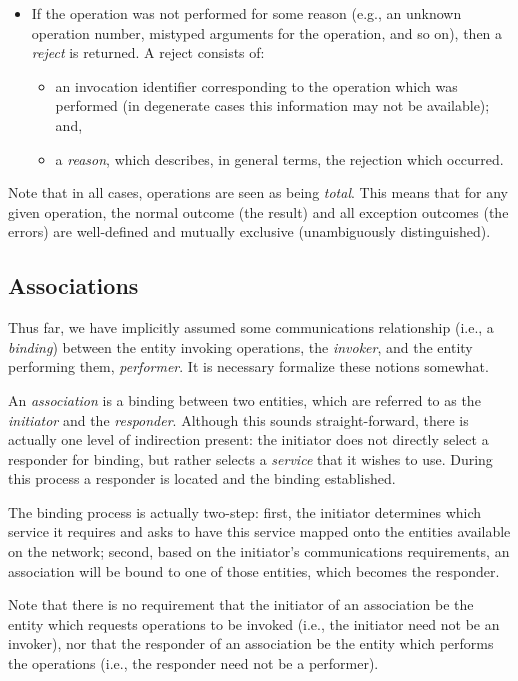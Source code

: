 \begin{itemize}
\item	If the operation was not performed for some reason
	(e.g., an unknown operation number, mistyped arguments for
	the operation, and so on), then a {\em reject\/} is returned.
	A reject consists of:
	\begin{itemize}
	\item	an invocation identifier corresponding to the operation
		which was performed
		(in degenerate cases this information may not be available);
		and,

	\item	a {\em reason},
		which describes, in general terms, the rejection which
		occurred.
	\end{itemize}
\end{itemize}
Note that in all cases,
operations are seen as being {\em total}.
This means that for any given operation,
the normal outcome (the result)
and all exception outcomes (the errors) are well-defined and mutually
exclusive (unambiguously distinguished).

\subsection	{Associations}
Thus far, we have implicitly assumed some communications relationship
(i.e., a {\em binding\/}) between the entity invoking operations,
the {\em invoker},
and the entity performing them,
{\em performer}.
It is necessary formalize these notions somewhat.

An {\em association\/} is a binding between two entities,
which are referred to as
the {\em initiator\/} and the {\em responder}.
Although this sounds straight-forward,
there is actually one level of indirection present:
the initiator does not directly select a responder for binding,
but rather selects a {\em service\/} that it wishes to use.
During this process a responder is located and the binding established.

The binding process is actually two-step:
first,
the initiator determines which service it requires and asks to have this
service mapped onto the entities available on the network;
second,
based on the initiator's communications requirements,
an association will be bound to one of those entities,
which becomes the responder.

Note that there is no requirement that the initiator of an association be the
entity which requests operations to be invoked
(i.e., the initiator need not be an invoker),
nor that the responder of an association be the entity which performs the
operations
(i.e., the responder need not be a performer).

